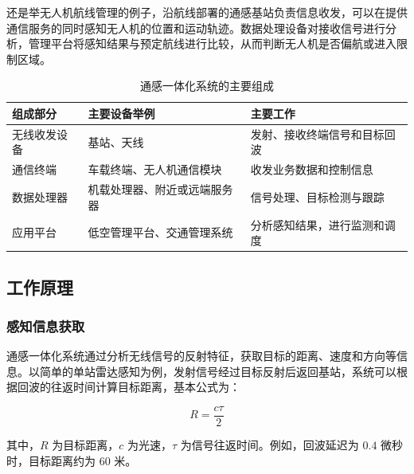 \documentclass[12pt,a4paper,UTF8,fontset=fandol]{ctexart}
\begin{document}
还是举无人机航线管理的例子，沿航线部署的通感基站负责信息收发，可以在提供通信服务的同时感知无人机的位置和运动轨迹。数据处理设备对接收信号进行分析，管理平台将感知结果与预定航线进行比较，从而判断无人机是否偏航或进入限制区域。

\begin{table}[htbp]
    \centering
    \caption{通感一体化系统的主要组成}
    \label{tab:isac-components}

    \small
    \renewcommand{\arraystretch}{1.5}

    \begin{tabularx}{\textwidth}{@{}lYY@{}}
        \toprule
        组成部分 & 主要设备举例 & 主要工作\\
        \midrule

        无线收发设备
        & 基站、天线
        & 发射、接收终端信号和目标回波 \\

        通信终端
        & 车载终端、无人机通信模块
        & 收发业务数据和控制信息 \\

        数据处理器
        & 机载处理器、附近或远端服务器
        & 信号处理、目标检测与跟踪 \\

        应用平台
        & 低空管理平台、交通管理系统
        & 分析感知结果，进行监测和调度 \\

        \bottomrule
    \end{tabularx}
\end{table}

\FloatBarrier

\subsection{工作原理}

\subsubsection{感知信息获取}

通感一体化系统通过分析无线信号的反射特征，获取目标的距离、速度和方向等信息。以简单的单站雷达感知为例，发射信号经过目标反射后返回基站，系统可以根据回波的往返时间计算目标距离，基本公式为：

\[
  R=\frac{c\tau}{2}
\]

其中，$R$ 为目标距离，$c$ 为光速，$\tau$ 为信号往返时间。例如，回波延迟为 $0.4$ 微秒时，目标距离约为 $60$ 米。
\end{document}
